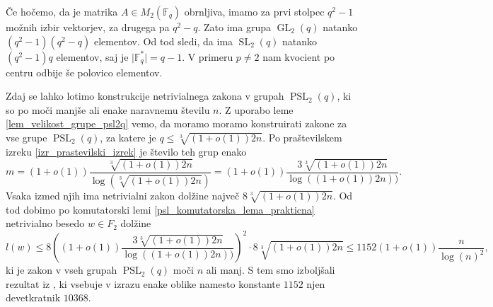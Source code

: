     \begin{dokaz}
   Če hočemo, da je matrika $A \in M_2(\mathbb{F}_q)$ obrnljiva, imamo za prvi stolpec $q^2 -1$ možnih izbir vektorjev, za drugega pa $q^2 - q$.  Zato ima grupa $\operatorname{GL}_2(q)$ natanko $(q^2  -1)(q^2 - q)$ elementov. 
    Od tod sledi, da ima $\operatorname{SL}_2(q)$ natanko $(q^2  -1)q$ elementov, saj je $\lvert \mathbb{F}_q^{*} \rvert = q-1$. V primeru $p \neq 2$ nam kvocient po centru odbije še polovico elementov.   
    \end{dokaz}
    
    Zdaj se lahko lotimo konstrukcije netrivialnega zakona v grupah $\operatorname{PSL}_2(q)$, ki so po moči manjše ali enake naravnemu številu $n$. Z uporabo leme \ref{lem_velikost_grupe_psl2q} vemo, da moramo moramo konstruirati zakone za vse grupe $\operatorname{PSL}_2(q)$, za katere je $q \le \sqrt[3]{(1 + o(1)) 2n}$. Po praštevilskem izreku \ref{izr_prastevilski_izrek} je število teh grup enako \begin{equation*}
        m =  (1 + o(1))\frac{\sqrt[3]{(1 + o(1)) 2n}}{\log\left(\sqrt[3]{(1 + o(1)) 2n} \right)} = (1 + o(1))\frac{3 \sqrt[3]{(1 + o(1)) 2n}}{\log((1 + o(1)) 2n))}.
    \end{equation*}
    Vsaka izmed njih ima netrivialni zakon dolžine največ $8 \sqrt[3]{(1 + o(1)) 2n}$.
    Od tod dobimo po komutatorski lemi \ref{psl_komutatorska_lema_prakticna} netrivialno besedo $w \in F_2$ dolžine \begin{equation*}
    l(w) \le 8 \left( (1 + o(1)) \frac{3 \sqrt[3]{(1 + o(1)) 2n}}{\log((1 + o(1)) 2n))}  \right)^2 \cdot 8 \sqrt[3]{(1 + o(1)) 2n} \le 1152 (1 + o(1)) \frac{n}{\log(n)^2},
    \end{equation*}  
    ki je zakon v vseh grupah $\operatorname{PSL}_2(q)$ moči $n$ ali manj. S tem smo izboljšali rezultat iz \cite[str.~37]{Schneider_2016}, ki vsebuje 
v izrazu enake oblike namesto konstante $1152$  njen devetkratnik $10368$.  
    


